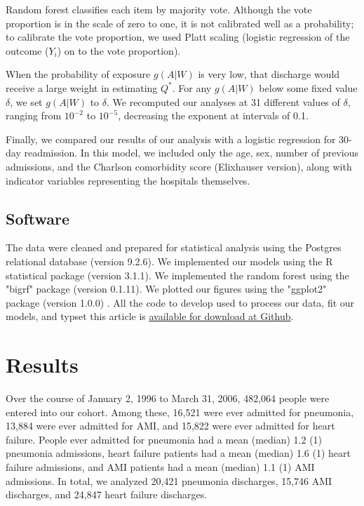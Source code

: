 \documentclass[]{article}\usepackage[]{graphicx}\usepackage[]{color}
\begin{document}
Random forest classifies each item by majority vote. Although the vote proportion is in the scale of zero to one, it is not calibrated well as a probability; to calibrate the vote proportion, we used Platt scaling\supercite{platt_probabilistic_1999} (logistic regression of the outcome ($Y_i$) on to the vote proportion). 

When the probability of exposure $g(A|W)$ is very low, that discharge would receive a large weight in estimating $Q^*$. For any $g(A|W)$ below some fixed value $\delta$, we set $g(A|W)$ to $\delta$. We recomputed our analyses at 31 different values of $\delta$, ranging from $10^{-2}$ to $10^{-5}$, decreasing the exponent at intervals of 0.1.

Finally, we compared our results of our analysis with a logistic regression for 30-day readmission. In this model, we included only the age, sex, number of previous admissions, and the Charlson comorbidity score (Elixhauser version)\supercite{elixhauser_comorbidity_1998}, along with indicator variables representing the hospitals themselves.

\subsection{Software}
The data were cleaned and prepared for statistical analysis using the Postgres relational database (version 9.2.6). We implemented our models using the R statistical package (version 3.1.1).\supercite{team_r:_2014} We implemented the random forest using the "bigrf" package (version 0.1.11).\supercite{lim_bigrf:_2014} We plotted our figures using the "ggplot2" package (version 1.0.0) .\supercite{wickham_ggplot2:_2009} All the code to develop used to process our data, fit our models, and typset this article is \href{https://github.com/nograpes/tmle_readmissions}{available for download at Github}.

\section{Results}


Over the course of January 2, 1996 to March 31, 2006, 482,064 people were entered into our cohort. Among these, 16,521 were ever admitted for pneumonia, 13,884 were ever admitted for AMI, and 15,822 were ever admitted for heart failure. People ever admitted for pneumonia had a mean (median) 1.2 (1) pneumonia admissions, heart failure patients had a mean (median) 1.6 (1) heart failure admissions, and AMI patients had a mean (median) 1.1 (1) AMI admissions. In total, we analyzed 20,421 pneumonia discharges, 15,746 AMI discharges, and 24,847 heart failure discharges.
\end{document}
